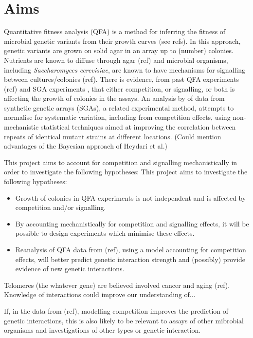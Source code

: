 
\section{Aims}
\label{sec:aims}


Quantitative fitness analysis (QFA) is a method for inferring the
fitness of microbial genetic variants from their growth curves (see
refs). In this approach, genetic variants are grown on solid agar in
an array up to (number) colonies. Nutrients are known to diffuse
through agar (ref) and microbial organisms, including
\textit{Saccharomyces cerevisiae}, are known to have mechanisms for
signalling between cultures/colonies (ref). There is evidence, from
past QFA experiments (ref) and SGA experiments
\citep{Baryshnikova2010}, that either competition, or signalling, or
both is affecting the growth of colonies in the assays. An analysis by
\citet{Baryshnikova2010} of data from synthetic genetic arrays (SGAs),
a related experimental method, attempts to normalise for systematic
variation, including from competition effects, using non-mechanistic
statistical techniques aimed at improving the correlation between
repeats of identical mutant strains at different locations.
(Could mention advantages of the Bayesian
approach of Heydari et al.)

This project aims to account for competition and signalling
mechanistically in order to investigate the following hypotheses:
This project aims to investigate the following hypotheses:
\begin{itemize}
\item Growth of colonies in QFA experiments is not independent and is
  affected by competition and/or signalling.
\item By accounting mechanistically for competition and signalling effects, it
  will be possible to design experiments which minimise these effects.
\item Reanalysis of QFA data from (ref), using a model accounting for
  competition effects, will better predict genetic interaction
  strength and (possibly) provide evidence of new genetic interactions.
\end{itemize}


Telomeres (the whatever gene) are believed involved cancer and aging
(ref). Knowledge of interactions could improve our understanding of...

If, in the data from (ref), modelling competition improves the
prediction of genetic interactions, this is also likely to be relevant
to assays of other mibrobial organisms and investigations of other
types or genetic interaction.


